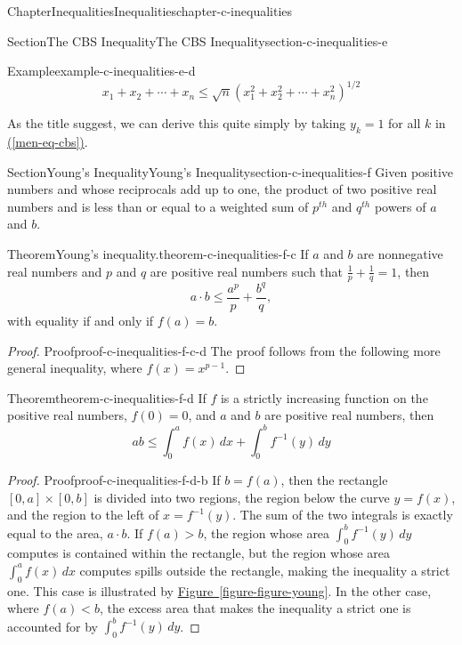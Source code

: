 \documentclass[oneside,10pt,]{book}
\newcommand{\xreffont}{\relax}
\numberwithin{equation}{section}
\newcommand{\lt}{<}
\newcommand{\gt}{>}
\begin{document}
\begin{chapterptx}{Chapter}{Inequalities}{}{Inequalities}{}{}{chapter-c-inequalities}
\begin{sectionptx}{Section}{The CBS Inequality}{}{The CBS Inequality}{}{}{section-c-inequalities-e}
\begin{example}{Example}{}{example-c-inequalities-e-d}
\begin{equation*}
x_1 + x_2 + \cdots + x_n \leq \sqrt{n} \left(x_1^2 + x_2^2 + \cdots + x_n^2\right)^{1/2} 
\end{equation*}
%
\par
As the title suggest, we can derive this quite simply by taking \(y_k = 1\) for all \(k\) in \hyperref[men-eq-cbs]{({\xreffont\ref{men-eq-cbs}})}.%
\end{example}
\end{sectionptx}
%
%
\typeout{************************************************}
\typeout{************************************************}
%
\begin{sectionptx}{Section}{Young's Inequality}{}{Young's Inequality}{}{}{section-c-inequalities-f}
Given positive numbers  and  whose reciprocals add up to one, the product  of two positive real numbers  and  is less than or equal to a weighted sum of \(p^{th}\) and \(q^{th}\) powers  of \(a\) and \(b\).%
\begin{theorem}{Theorem}{Young's inequality.}{}{theorem-c-inequalities-f-c}%
%
If \(a\) and \(b\) are nonnegative real numbers and \(p\) and \(q\) are positive real numbers such that \(\frac{1}{p} + \frac{1}{q} = 1\), then%
\begin{equation*}
a\cdot b \leq \frac{a^{p}}{p} + \frac{b^{q}}{q},
\end{equation*}
with equality if and only if \(f(a)=b\).%
\end{theorem}
\begin{proof}{Proof}{}{proof-c-inequalities-f-c-d}
The proof follows from the following more general inequality, where \(f(x)=x^{p-1}\).%
\end{proof}
\begin{theorem}{Theorem}{}{}{theorem-c-inequalities-f-d}%
If \(f\) is a strictly increasing function on the positive real numbers, \(f(0)=0\), and \(a\) and \(b\) are positive real numbers, then%
\begin{equation*}
a b \leq \int_0^a f(x) \, dx +\int_0^b f^{-1}(y) \, dy
\end{equation*}
%
\end{theorem}
\begin{proof}{Proof}{}{proof-c-inequalities-f-d-b}
If \(b=f(a)\), then the rectangle \([0,a]\times[0,b]\) is divided into two regions, the region below the curve \(y=f(x)\), and the region to the left of \(x = f^{-1}(y)\).  The sum of the two integrals is exactly equal to the area, \(a\cdot b\).  If \(f(a) \gt b\), the region whose area  \(\int_0^b f^{-1}(y) \, dy\) computes is contained within the rectangle, but the region whose area \(\int_0^a f(x) \, dx\) computes spills outside the rectangle, making the inequality a strict one.  This case is illustrated by \hyperref[figure-figure-young]{Figure~{\xreffont\ref{figure-figure-young}}}.  In the other case, where \(f(a) \lt b\), the excess area that makes the inequality a strict one is accounted for by \(\int_0^b f^{-1}(y) \, dy\).%

\end{proof}
\end{sectionptx}
\end{chapterptx}
\end{document}
